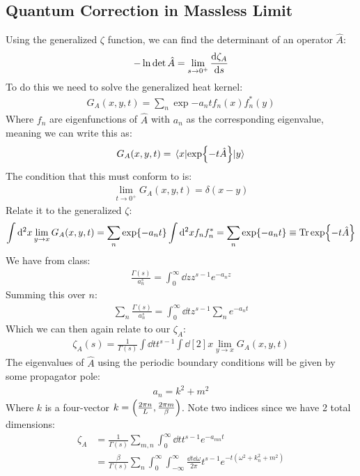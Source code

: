 \documentclass[12pt]{article}
\newcommand{\A}{\hat{A}}
\begin{document}
\subsection{Quantum Correction in Massless Limit}
Using the generalized $\zeta$ function, we can find the determinant of an operator $\A$:
\begin{align*}
  -\ln\det\A=\lim_{s\to0^+}\dv{\zeta_A}{s}
\end{align*}
To do this we need to solve the generalized heat kernel:
\begin{align*}
  G_A(x,y,t)=\sum_n\exp{-a_nt}f_n(x)f_n^*(y)
\end{align*}
Where $f_n$ are eigenfunctions of $\A$ with $a_n$ as the corresponding eigenvalue, meaning we can write this as:
\begin{align*}
  G_A(x,y,t)=\mel{x}{\exp{-t\A}}{y}
\end{align*}
The condition that this must conform to is:
\begin{align*}
  \lim_{t\to0^+}G_A(x,y,t)=\delta(x-y)
\end{align*}
Relate it to the generalized $\zeta$:
\begin{align*}
  \int\dd[2]x\lim_{y\to x}G_A(x,y,t)=\sum_n\exp{-a_nt}\int\dd[2]xf_nf_n^*
  =\sum_n\exp{-a_nt}\equiv\Tr\exp{-t\A}
\end{align*}
We have from class:
\begin{align*}
  \frac{\Gamma(s)}{a_n^s}=\int_0^\infty\dd{z}z^{s-1}e^{-a_nz}
\end{align*}
Summing this over $n$:
\begin{align*}
  \sum_n\frac{\Gamma(s)}{a_n^s}=\int_0^\infty\dd{t}z^{s-1}\sum_ne^{-a_nt}
\end{align*}
Which we can then again relate to our $\zeta_A$:
\begin{align*}
  \zeta_A(s)=\frac{1}{\Gamma(s)}\int\dd{t}t^{s-1}\int\dd[2]x
  \lim_{y\to x}G_A(x,y,t)
\end{align*}
The eigenvalues of $\A$ using the periodic boundary conditions will be given by some propagator pole:
\begin{align*}
  a_n=k^2+m^2
\end{align*}
Where $k$ is a four-vector $k=\qty(\frac{2\pi n}{L},\frac{2\pi m}{\beta})$. Note two indices since we have 2 total dimensions:
\begin{align*}
  \zeta_A&=\frac{1}{\Gamma(s)}\sum_{m,n}\int_0^\infty\dd{t}t^{s-1}e^{-a_{mn}t}\\
  &=\frac{\beta}{\Gamma(s)}\sum_{n}\int_0^\infty\int_{-\infty}^\infty
  \frac{\dd{t}\dd\omega}{2\pi}t^{s-1}e^{-t(\omega^2+k_n^2+m^2)}
\end{align*}
\end{document}
